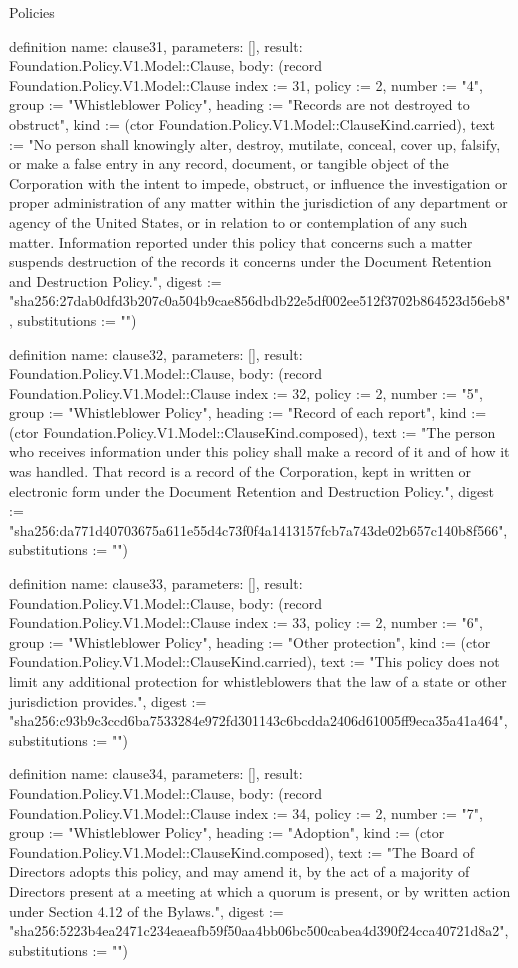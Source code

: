 \begin{lexlean}{Policies}
\begin{semanticmodule}
definition{
  name: clause31,
  parameters: [],
  result: Foundation.Policy.V1.Model::Clause,
  body: (record Foundation.Policy.V1.Model::Clause {index := 31, policy := 2, number := "4", group := "Whistleblower Policy", heading := "Records are not destroyed to obstruct", kind := (ctor Foundation.Policy.V1.Model::ClauseKind.carried), text := "No person shall knowingly alter, destroy, mutilate, conceal, cover up, falsify, or make a false entry in any record, document, or tangible object of the Corporation with the intent to impede, obstruct, or influence the investigation or proper administration of any matter within the jurisdiction of any department or agency of the United States, or in relation to or contemplation of any such matter. Information reported under this policy that concerns such a matter suspends destruction of the records it concerns under the Document Retention and Destruction Policy.", digest := "sha256:27dab0dfd3b207c0a504b9cae856dbdb22e5df002ee512f3702b864523d56eb8", substitutions := ""})
}

definition{
  name: clause32,
  parameters: [],
  result: Foundation.Policy.V1.Model::Clause,
  body: (record Foundation.Policy.V1.Model::Clause {index := 32, policy := 2, number := "5", group := "Whistleblower Policy", heading := "Record of each report", kind := (ctor Foundation.Policy.V1.Model::ClauseKind.composed), text := "The person who receives information under this policy shall make a record of it and of how it was handled. That record is a record of the Corporation, kept in written or electronic form under the Document Retention and Destruction Policy.", digest := "sha256:da771d40703675a611e55d4c73f0f4a1413157fcb7a743de02b657c140b8f566", substitutions := ""})
}

definition{
  name: clause33,
  parameters: [],
  result: Foundation.Policy.V1.Model::Clause,
  body: (record Foundation.Policy.V1.Model::Clause {index := 33, policy := 2, number := "6", group := "Whistleblower Policy", heading := "Other protection", kind := (ctor Foundation.Policy.V1.Model::ClauseKind.carried), text := "This policy does not limit any additional protection for whistleblowers that the law of a state or other jurisdiction provides.", digest := "sha256:c93b9c3ccd6ba7533284e972fd301143c6bcdda2406d61005ff9eca35a41a464", substitutions := ""})
}

definition{
  name: clause34,
  parameters: [],
  result: Foundation.Policy.V1.Model::Clause,
  body: (record Foundation.Policy.V1.Model::Clause {index := 34, policy := 2, number := "7", group := "Whistleblower Policy", heading := "Adoption", kind := (ctor Foundation.Policy.V1.Model::ClauseKind.composed), text := "The Board of Directors adopts this policy, and may amend it, by the act of a majority of Directors present at a meeting at which a quorum is present, or by written action under Section 4.12 of the Bylaws.", digest := "sha256:5223b4ea2471c234eaeafb59f50aa4bb06bc500cabea4d390f24cca40721d8a2", substitutions := ""})
}


\end{semanticmodule}
\end{lexlean}
